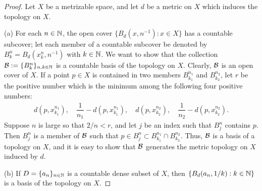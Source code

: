 \begin{proof}
    \hangindent=0.65cm
    Let $X$ be a metrizable space, and let $d$ be a metric on $X$ which induces the topology on $X$.

    \noindent(a)
    For each $n\in{\mathbb{N}}$, the open cover $\{B_d\left(x, n^{-1}\right): x\in X\}$ has a countable subcover; let each member of a countable subcover be denoted by $B_k^n=B_d(x_k^n, n^{-1})$ with $k\in{\mathbb{N}}$.
    We want to show that the collection ${\mathcal{B}}:=\{B_k^n\}_{n, k\in{\mathbb{N}}}$ is a countable basis of the topology on $X$.
    Clearly, ${\mathcal{B}}$ is an open cover of $X$.
    If a point $p\in X$ is contained in two members $B_{k_1}^{n_1}$ and $B_{k_2}^{n_2}$, let $r$ be the positive number which is the minimum among the following four positive numbers:
    \begin{align*}
        d(p, x_{k_1}^{n_1}),\quad\dfrac{1}{n_1}-d(p, x_{k_1}^{n_1}),\quad d(p, x_{k_2}^{n_2}),\quad\dfrac{1}{n_2}-d(p, x_{k_2}^{n_2}).
    \end{align*}
    Suppose $n$ is large so that $2/n<r$, and let $j$ be an index such that $B_j^n$ contains $p$.
    Then $B_j^n$ is a member of ${\mathcal{B}}$ such that $p\in B_j^n\subset B_{k_1}^{n_1}\cap B_{k_2}^{n_2}$.
    Thus, ${\mathcal{B}}$ is a basis of a topology on $X$, and it is easy to show that ${\mathcal{B}}$ generates the metric topology on $X$ induced by $d$.

    \noindent(b)
    If $D=\{a_n\}_{n\in{\mathbb{N}}}$ is a countable dense subset of $X$, then $\{B_d(a_n, 1/k): k\in{\mathbb{N}}\}$ is a basis of the topology on $X$.
\end{proof}

